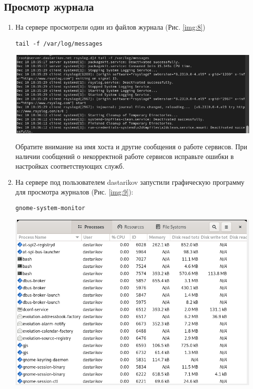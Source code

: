\subsection{Просмотр журнала}
\begin{enumerate}
\item На сервере просмотрели один из файлов журнала (Рис. \ref{img:8})
    \begin{verbatim}
tail -f /var/log/messages
    \end{verbatim}

\begin{center}
    \centering
    \includegraphics[width=\textwidth]{../images/image08.png}
    \label{img:8}
\end{center}

Обратите внимание на имя хоста и другие сообщения о работе сервисов. При наличии сообщений о некорректной работе сервисов исправьте ошибки в настройках соответствующих служб.

\item На сервере под пользователем dastarikov запустили графическую программу для просмотра журналов (Рис. \ref{img:9}):
    \begin{verbatim}
gnome-system-monitor
    \end{verbatim}

\begin{center}
    \centering
    \includegraphics[width=\textwidth]{../images/image09.png}
    \label{img:9}
\end{center}


\end{enumerate}
